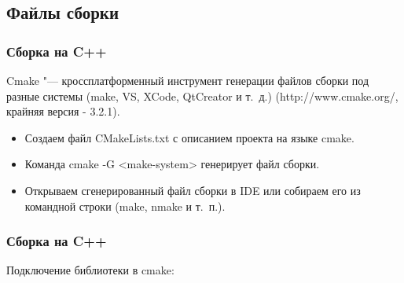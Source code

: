 \documentclass[default]{beamer}
\begin{document}
	\subsection{Файлы сборки}	
	\begin{frame}
		\frametitle{Сборка на C++}
		
		Cmake "--- кроссплатформенный инструмент генерации файлов сборки под разные системы (make, VS, XCode, QtCreator и т.~д.) (http://www.cmake.org/, крайняя версия - 3.2.1).
		\begin{itemize}
			\item Создаем файл CMakeLists.txt с описанием проекта на языке cmake.
			\item Команда cmake -G <make-system> генерирует файл сборки.
			\item Открываем сгенерированный файл сборки в IDE или собираем его из командной строки (make, nmake и т.~п.).
		\end{itemize}
		
		\lstCMake
	\end{frame}

	\begin{frame}
		\frametitle{Сборка на C++}
		
		Подключение библиотеки в cmake: 
		
		\lstCMakeLib
	\end{frame}
\end{document}

